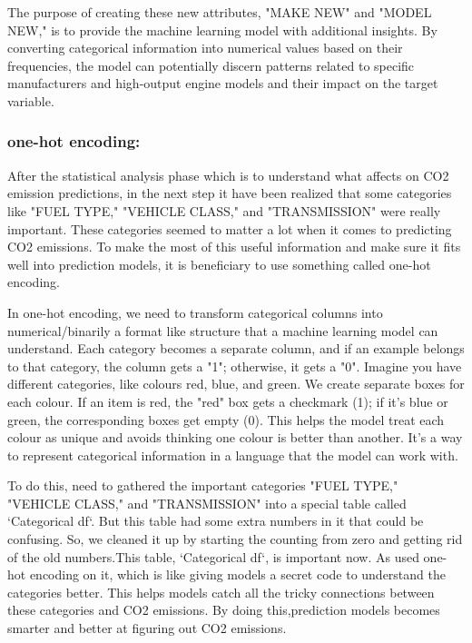 \documentclass[12pt, a4paper,oneside]{book}
\numberwithin{equation}{section}
\begin{document}
The purpose of creating these new attributes, "MAKE NEW" and "MODEL NEW," is to provide the machine learning model with additional insights. By converting categorical information into numerical values based on their frequencies, the model can potentially discern patterns related to specific manufacturers and high-output engine models and their impact on the target variable.

\subsubsection{one-hot encoding:}

After the statistical analysis phase which is to understand what affects on CO2 emission predictions, in the next step it have been realized that some categories like "FUEL TYPE," "VEHICLE CLASS," and "TRANSMISSION" were really important. These categories seemed to matter a lot when it comes to predicting CO2 emissions. To make the most of this useful information and make sure it fits well into prediction models, it is beneficiary to use something called one-hot encoding.

In one-hot encoding, we need to transform categorical columns into numerical/binarily a format like structure that a machine learning model can understand. Each category becomes a separate column, and if an example belongs to that category, the column gets a "1"; otherwise, it gets a "0". Imagine you have different categories, like colours red, blue, and green. We create separate boxes for each colour. If an item is red, the "red" box gets a checkmark (1); if it's blue or green, the corresponding boxes get empty (0). This helps the model treat each colour as unique and avoids thinking one colour is better than another. It's a way to represent categorical information in a language that the model can work with.~\cite{ref18}


To do this, need to gathered the important categories  "FUEL TYPE," "VEHICLE CLASS," and "TRANSMISSION"  into a special table called `Categorical df`. But this table had some extra numbers in it that could be confusing. So, we cleaned it up by starting the counting from zero and getting rid of the old numbers.This table, `Categorical df`, is  important now. As used one-hot encoding on it, which is like giving  models a secret code to understand the categories better. This helps  models catch all the tricky connections between these categories and CO2 emissions. By doing this,prediction models becomes smarter and better at figuring out CO2 emissions.
\end{document}
